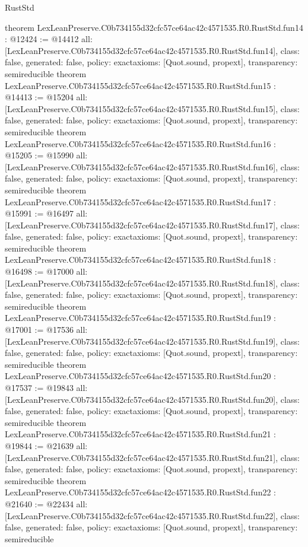 \begin{lexlean}{RustStd}
\begin{coremodule}
{}
theorem LexLeanPreserve.C0b734155d32cfc57ce64ac42c4571535.R0.RustStd.fun14 : @12424 := @14412 {
  all: [LexLeanPreserve.C0b734155d32cfc57ce64ac42c4571535.R0.RustStd.fun14],
  class: false,
  generated: false,
  policy: exact{axioms: [Quot.sound, propext]},
  transparency: semireducible
}
theorem LexLeanPreserve.C0b734155d32cfc57ce64ac42c4571535.R0.RustStd.fun15 : @14413 := @15204 {
  all: [LexLeanPreserve.C0b734155d32cfc57ce64ac42c4571535.R0.RustStd.fun15],
  class: false,
  generated: false,
  policy: exact{axioms: [Quot.sound, propext]},
  transparency: semireducible
}
theorem LexLeanPreserve.C0b734155d32cfc57ce64ac42c4571535.R0.RustStd.fun16 : @15205 := @15990 {
  all: [LexLeanPreserve.C0b734155d32cfc57ce64ac42c4571535.R0.RustStd.fun16],
  class: false,
  generated: false,
  policy: exact{axioms: [Quot.sound, propext]},
  transparency: semireducible
}
theorem LexLeanPreserve.C0b734155d32cfc57ce64ac42c4571535.R0.RustStd.fun17 : @15991 := @16497 {
  all: [LexLeanPreserve.C0b734155d32cfc57ce64ac42c4571535.R0.RustStd.fun17],
  class: false,
  generated: false,
  policy: exact{axioms: [Quot.sound, propext]},
  transparency: semireducible
}
theorem LexLeanPreserve.C0b734155d32cfc57ce64ac42c4571535.R0.RustStd.fun18 : @16498 := @17000 {
  all: [LexLeanPreserve.C0b734155d32cfc57ce64ac42c4571535.R0.RustStd.fun18],
  class: false,
  generated: false,
  policy: exact{axioms: [Quot.sound, propext]},
  transparency: semireducible
}
theorem LexLeanPreserve.C0b734155d32cfc57ce64ac42c4571535.R0.RustStd.fun19 : @17001 := @17536 {
  all: [LexLeanPreserve.C0b734155d32cfc57ce64ac42c4571535.R0.RustStd.fun19],
  class: false,
  generated: false,
  policy: exact{axioms: [Quot.sound, propext]},
  transparency: semireducible
}
theorem LexLeanPreserve.C0b734155d32cfc57ce64ac42c4571535.R0.RustStd.fun20 : @17537 := @19843 {
  all: [LexLeanPreserve.C0b734155d32cfc57ce64ac42c4571535.R0.RustStd.fun20],
  class: false,
  generated: false,
  policy: exact{axioms: [Quot.sound, propext]},
  transparency: semireducible
}
theorem LexLeanPreserve.C0b734155d32cfc57ce64ac42c4571535.R0.RustStd.fun21 : @19844 := @21639 {
  all: [LexLeanPreserve.C0b734155d32cfc57ce64ac42c4571535.R0.RustStd.fun21],
  class: false,
  generated: false,
  policy: exact{axioms: [Quot.sound, propext]},
  transparency: semireducible
}
theorem LexLeanPreserve.C0b734155d32cfc57ce64ac42c4571535.R0.RustStd.fun22 : @21640 := @22434 {
  all: [LexLeanPreserve.C0b734155d32cfc57ce64ac42c4571535.R0.RustStd.fun22],
  class: false,
  generated: false,
  policy: exact{axioms: [Quot.sound, propext]},
  transparency: semireducible
}
\end{coremodule}
\end{lexlean}
